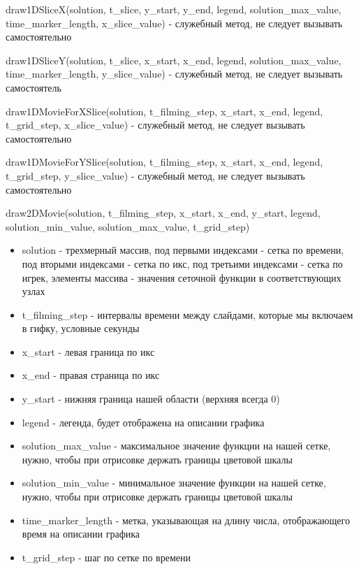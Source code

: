 \documentclass{article}
\begin{document}
\noindent 
draw1DSliceX(solution, t\_slice, y\_start, y\_end, legend, solution\_max\_value, time\_marker\_length, x\_slice\_value) - служебный метод, не следует вызывать самостоятельно

\noindent
draw1DSliceY(solution, t\_slice, x\_start, x\_end, legend, solution\_max\_value, time\_marker\_length, y\_slice\_value) - служебный метод, не следует вызывать самостоятель


\noindent
draw1DMovieForXSlice(solution, t\_filming\_step, x\_start, x\_end, legend, t\_grid\_step, x\_slice\_value) - служебный метод, не следует вызывать самостоятельно

\noindent
draw1DMovieForYSlice(solution, t\_filming\_step, x\_start, x\_end, legend, t\_grid\_step, y\_slice\_value) - служебный метод, не следует вызывать самостоятельно


\noindent 
\newline
draw2DMovie(solution, t\_filming\_step, x\_start, x\_end, y\_start, legend, solution\_min\_value, solution\_max\_value, t\_grid\_step)
\begin{itemize}
\item solution - трехмерный массив, под первыми индексами - сетка по времени, под вторыми индексами - сетка по икс, под третьими индексами - сетка по игрек, элементы массива - значения сеточной функции в соответствующих узлах
\item t\_filming\_step - интервалы времени между слайдами, которые мы включаем в гифку, условные секунды
\item x\_start - левая граница по икс
\item x\_end - правая страница по икс
\item y\_start - нижняя граница нашей области (верхняя всегда 0)
\item legend - легенда, будет отображена на описании графика
\item solution\_max\_value - максимальное значение функции на нашей сетке, нужно, чтобы при отрисовке держать границы цветовой шкалы
\item solution\_min\_value - минимальное значение функции на нашей сетке, нужно, чтобы при отрисовке держать границы цветовой шкалы
\item time\_marker\_length - метка, указывающая на длину числа, отображающего время на описании графика
\item t\_grid\_step - шаг по сетке по времени
\end{itemize}
\end{document}
